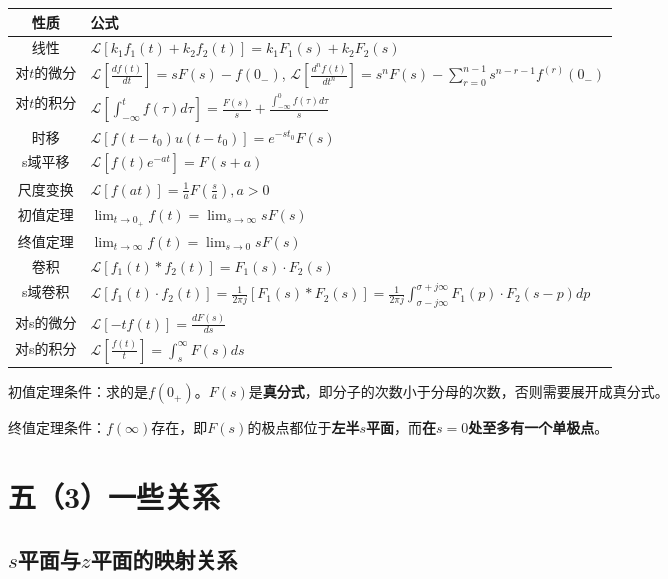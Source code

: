 \begin{center}
\begin{tabularx}{\columnwidth}{|c|X|}
\hline
性质 & 公式 \\
\hline
线性 & $\mathcal{L}[k_1f_1(t)+k_2f_2(t)]=k_1F_1(s)+k_2F_2(s)$ \\
\hline
对$t$的微分 & $\mathcal{L}[\frac{df(t)}{dt}]=sF(s)-f(0_-)$, $\mathcal{L}[\frac{d^nf(t)}{dt^n}]=s^nF(s)-\sum_{r = 0}^{n-1}s^{n-r-1}f^{(r)}(0_-)  $ \\
\hline
对$t$的积分 & $\mathcal{L}[\int_{-\infty}^tf(\tau)d\tau]=\frac{F(s)}{s}+\frac{\int_{-\infty}^0f(\tau)d\tau}{s}$ \\
\hline
时移 & $\mathcal{L}[f(t-t_0)u(t-t_0)]=e^{-st_0}F(s)$ \\
\hline
s域平移 & $\mathcal{L}[f(t)e^{-at}]=F(s+a)$ \\
\hline
尺度变换 & $\mathcal{L}[f(at)]=\frac{1}{a}F(\frac{s}{a}), a>0$ \\
\hline
初值定理 & $\lim_{t \to 0_+}f(t)=\lim_{s \to \infty}sF(s)  $ \\
\hline
终值定理 & $\lim_{t \to \infty}f(t)=\lim_{s \to 0}sF(s)  $ \\
\hline
卷积 & $\mathcal{L}[f_1(t)*f_2(t)]=F_1(s)\cdot F_2(s)$ \\
\hline
s域卷积 & $ \mathcal{L}[f_1(t)\cdot f_2(t)]=\frac{1}{2\pi j}[F_1(s)*F_2(s)]=\frac{1}{2\pi j}\int_{\sigma-j\infty}^{\sigma+j\infty}F_1(p)\cdot F_2(s-p)dp $ \\
\hline
对s的微分 & $\mathcal{L}[-tf(t)]=\frac{dF(s)}{ds}$ \\
\hline
对s的积分 & $\mathcal{L}[\frac{f(t)}{t}]=\int_s^{\infty}F(s)ds$ \\
\hline
\end{tabularx}
\end{center}

初值定理条件：求的是$f(0_+)$。$F(s)$是\textbf{真分式}，即分子的次数小于分母的次数，否则需要展开成真分式。

终值定理条件：$f(\infty)$存在，即$F(s)$的极点都位于\textbf{左半$s$平面}，而\textbf{在$s=0$处至多有一个单极点}。

\section*{五（3）一些关系}

\subsection*{$s$平面与$z$平面的映射关系}

